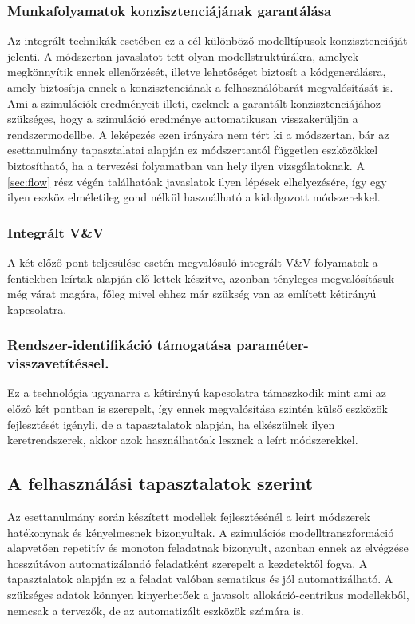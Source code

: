             \subsubsection{Munkafolyamatok konzisztenciájának garantálása}
            Az integrált technikák esetében ez a cél különböző modelltípusok konzisztenciáját jelenti. A módszertan javaslatot tett olyan modellstruktúrákra, amelyek megkönnyítik ennek ellenőrzését, illetve lehetőséget biztosít a kódgenerálásra, amely biztosítja ennek a konzisztenciának a felhasználóbarát megvalósítását is.
            Ami a szimulációk eredményeit illeti, ezeknek a garantált konzisztenciájához szükséges, hogy a szimuláció eredménye automatikusan visszakerüljön a rendszermodellbe.
            A leképezés ezen irányára nem tért ki a módszertan, bár az esettanulmány tapasztalatai alapján ez módszertantól független eszközökkel biztosítható, ha a tervezési folyamatban van hely ilyen vizsgálatoknak.
            A \ref{sec:flow} rész végén találhatóak javaslatok ilyen lépések elhelyezésére, így egy ilyen eszköz elméletileg gond nélkül használható a kidolgozott módszerekkel.

            \subsubsection{Integrált V\&V}
            A két előző pont teljesülése esetén megvalósuló integrált V\&V folyamatok a fentiekben leírtak alapján elő lettek készítve, azonban tényleges megvalósításuk még várat magára, főleg mivel ehhez már szükség van az említett kétirányú kapcsolatra.
            
            \subsubsection{Rendszer-identifikáció támogatása paraméter-visszavetítéssel.}
            Ez a technológia ugyanarra a kétirányú kapcsolatra támaszkodik mint ami az előző két pontban is szerepelt, így ennek megvalósítása szintén külső eszközök fejlesztését igényli, de a tapasztalatok alapján, ha elkészülnek ilyen keretrendszerek, akkor azok használhatóak lesznek a leírt módszerekkel.

    \subsection{A felhasználási tapasztalatok szerint}
    Az esettanulmány során készített modellek fejlesztésénél a leírt módszerek hatékonynak és kényelmesnek bizonyultak.
    A szimulációs modelltranszformáció alapvetően repetitív és monoton feladatnak bizonyult, azonban ennek az elvégzése hosszútávon automatizálandó feladatként szerepelt a kezdetektől fogva.
    A tapasztalatok alapján ez a feladat valóban sematikus és jól automatizálható. A szükséges adatok könnyen kinyerhetőek a javasolt allokáció-centrikus modellekből, nemcsak a tervezők, de az automatizált eszközök számára is.